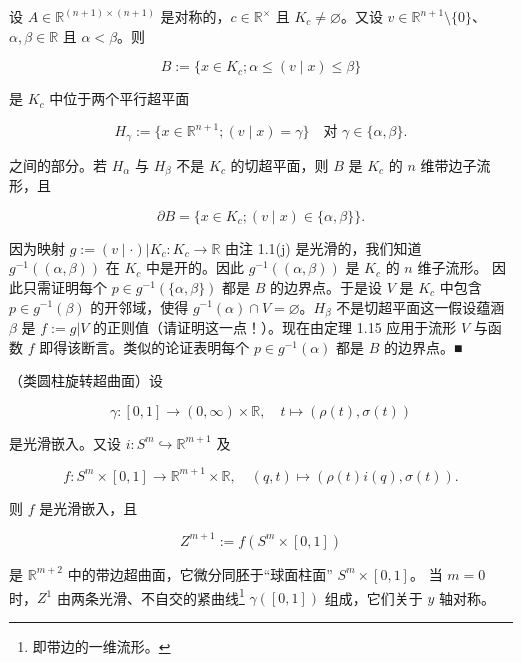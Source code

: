 \begin{example}
\begin{items}
设 $ A \in \mathbb{R}^{(n+1) \times (n+1)} $ 是对称的，$ c \in \mathbb{R}^{\times} $ 且 $ K_{c} \ne \varnothing $。又设 $ v \in \mathbb{R}^{n+1} \setminus \{0\} $、$ \alpha, \beta \in \mathbb{R} $ 且 $ \alpha < \beta $。则

\[
B := \{x \in K_{c} ; \alpha \le (v \mid x) \le \beta\}
\]

是 $ K_{c} $ 中位于两个平行超平面

\[
H_{\gamma} := \{x \in \mathbb{R}^{n+1} ; (v \mid x) = \gamma\} \quad \text{对 } \gamma \in \{\alpha, \beta\}.
\]

之间的部分。若 $ H_{\alpha} $ 与 $ H_{\beta} $ 不是 $ K_{c} $ 的切超平面，则 $ B $ 是 $ K_{c} $ 的 $ n $ 维带边子流形，且

\[
\partial B = \{x \in K_{c} ; (v \mid x) \in \{\alpha, \beta\}\}.
\]

\proofhead
因为映射 $ g := (v \mid \cdot)|K_{c}: K_{c} \to \mathbb{R} $ 由注 1.1(j) 是光滑的，我们知道 $ g^{-1}((\alpha, \beta)) $ 在 $ K_{c} $ 中是开的。因此 $ g^{-1}((\alpha, \beta)) $ 是 $ K_{c} $ 的 $ n $ 维子流形。
因此只需证明每个 $ p \in g^{-1}(\{\alpha, \beta\}) $ 都是 $ B $ 的边界点。于是设 $ V $ 是 $ K_{c} $ 中包含 $ p \in g^{-1}(\beta) $ 的开邻域，使得 $ g^{-1}(\alpha) \cap V = \varnothing $。$ H_{\beta} $ 不是切超平面这一假设蕴涵 $ \beta $ 是 $ f := g|V $ 的正则值（请证明这一点！）。现在由定理 1.15 应用于流形 $ V $ 与函数 $ f $ 即得该断言。类似的论证表明每个 $ p \in g^{-1}(\alpha) $ 都是 $ B $ 的边界点。\nobreak\hspace{0.35em}■
\item[（d）]

（类圆柱旋转超曲面）设

\[
\gamma: [0, 1] \to (0, \infty) \times \mathbb{R}, \quad t \mapsto (\rho(t), \sigma(t))
\]

是光滑嵌入。又设 $ i: S^{m} \hookrightarrow \mathbb{R}^{m+1} $ 及

\[
f: S^{m} \times [0, 1] \to \mathbb{R}^{m+1} \times \mathbb{R}, \quad (q, t) \mapsto (\rho(t)i(q), \sigma(t)).
\]

则 $ f $ 是光滑嵌入，且

\[
Z^{m+1} := f(S^{m} \times [0, 1])
\]

是 $ \mathbb{R}^{m+2} $ 中的带边超曲面，它微分同胚于“球面柱面” $ S^{m} \times [0, 1] $。
当 $ m = 0 $ 时，$ Z^{1} $ 由两条光滑、不自交的紧曲线\footnote{即带边的一维流形。} $ \gamma([0, 1]) $ 组成，它们关于 $ y $ 轴对称。

\end{items}


\end{example}
